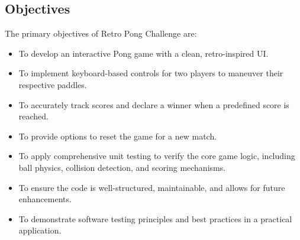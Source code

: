 \documentclass[12pt,a4paper]{article}
\begin{document}
\subsection{Objectives}
The primary objectives of Retro Pong Challenge are:
\begin{itemize}
    \item To develop an interactive Pong game with a clean, retro-inspired UI.
    \item To implement keyboard-based controls for two players to maneuver their respective paddles.
    \item To accurately track scores and declare a winner when a predefined score is reached.
    \item To provide options to reset the game for a new match.
    \item To apply comprehensive unit testing to verify the core game logic, including ball physics, collision detection, and scoring mechanisms.
    \item To ensure the code is well-structured, maintainable, and allows for future enhancements.
    \item To demonstrate software testing principles and best practices in a practical application.
\end{itemize}
\end{document}
